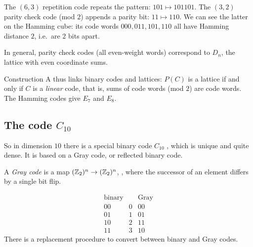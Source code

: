 \begin{example}
The $(6,3)$ repetition code repeats the pattern: $101\mapsto101101$. The $(3,2)$ parity check code
(mod $2$) appends a parity bit: $11\mapsto 110$. We can see the latter on the Hamming cube: its code
words $000,011,101,110$ all have Hamming distance $2$, i.e.\ are $2$ bits apart.
\begin{center}
\end{center}
In general, parity check codes (all even-weight words) correspond to $D_n$, the lattice with even
coordinate sums.
\end{example}

Construction A thus links binary codes and lattices: $P(C)$ is a lattice if and only if $C$ is a
\emph{linear} code, that is, sums of code words (mod $2$) are code words.
The Hamming codes give $E_7$ and $E_8$. 

\subsection*{The code \texorpdfstring{$C_{10}$}{C10}}
So in dimension $10$ there is a special binary code $C_{10}$ , which is unique
 and quite dense. It is based on a Gray code, or reflected binary code.

\begin{definition}
A \emph{Gray code} is a map $(\mathbb{Z}_2)^n\to(\mathbb{Z}_2)^n$, ,
where the successor of an element differs by a single bit flip.
\end{definition}
\[
  \begin{array}{ccc}
    \text{binary} & & \text{Gray}\\ \hline
    00 & 0 & 00\\ 01 & 1 & 01\\ 10 & 2 & 11\\ 11 & 3 & 10
  \end{array}
\]
There is a replacement procedure to convert between binary and Gray codes.

